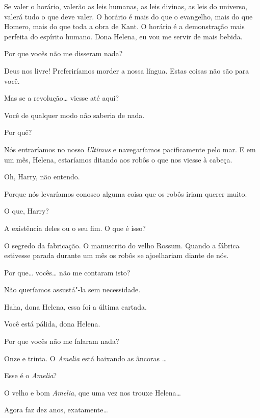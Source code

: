  Se valer o horário, valerão as leis humanas, as leis divinas, as
leis do universo, valerá tudo o que deve valer. O horário é mais do que o
evangelho, mais do que Homero, mais do que toda a obra de Kant. O horário é a
demonstração mais perfeita do espírito humano. Dona Helena, eu vou me servir de
mais bebida.

 Por que vocês não me disseram nada?

 Deus nos livre! Preferiríamos morder a nossa língua. Estas coisas não
são para você.

 Mas se a revolução\ldots{} viesse até aqui?

 Você de qualquer modo não saberia de nada.

 Por quê?

 Nós entraríamos no nosso \textit{Ultimus} e navegaríamos pacificamente pelo mar. E
em um mês, Helena, estaríamos ditando aos robôs o que nos viesse à cabeça.

 Oh, Harry, não entendo.

 Porque nós levaríamos conosco alguma coisa que os robôs iriam querer
muito.

 O que, Harry?

 A existência deles ou o seu fim.  O que é
isso?

  O segredo da fabricação. O manuscrito do velho
Rossum. Quando a fábrica estivesse parada durante um mês os robôs se ajoelhariam
diante de nós.

 Por que\ldots{} vocês\ldots{} não me contaram isto?

 Não queríamos assustá"-la sem necessidade.

 Haha, dona Helena, essa foi a última cartada.

 Você está pálida, dona Helena.

 Por que vocês não me falaram nada?

  Onze e trinta. O \textit{Amelia} está baixando as âncoras
\ldots{}

 Esse é o \textit{Amelia}?

 O velho e bom \textit{Amelia}, que uma vez nos trouxe Helena\ldots{}

 Agora faz dez anos, exatamente\ldots{}

